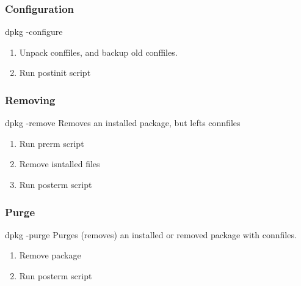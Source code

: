 \documentclass[10pt]{article}
\begin{document}
\begin{enumerate}
        \subsubsection*{Configuration}
        dpkg -configure
        \begin{enumerate}[label=\arabic*,ref=\theenumi]
            \item Unpack conffiles, and backup old conffiles.
            \item Run postinit script
        \end{enumerate}

        \subsubsection*{Removing}
        dpkg -remove
        Removes an installed package, but lefts connfiles
        \begin{enumerate}[label=\arabic*,ref=\theenumi]
            \item Run prerm script
            \item Remove isntalled files
            \item Run posterm script
        \end{enumerate}

        \subsubsection*{Purge}
        dpkg -purge
        Purges (removes) an installed or removed package with connfiles.
        \begin{enumerate}[label=\arabic*,ref=\theenumi]
            \item Remove package
            \item Run posterm script
        \end{enumerate}





\end{enumerate}
\end{document}
